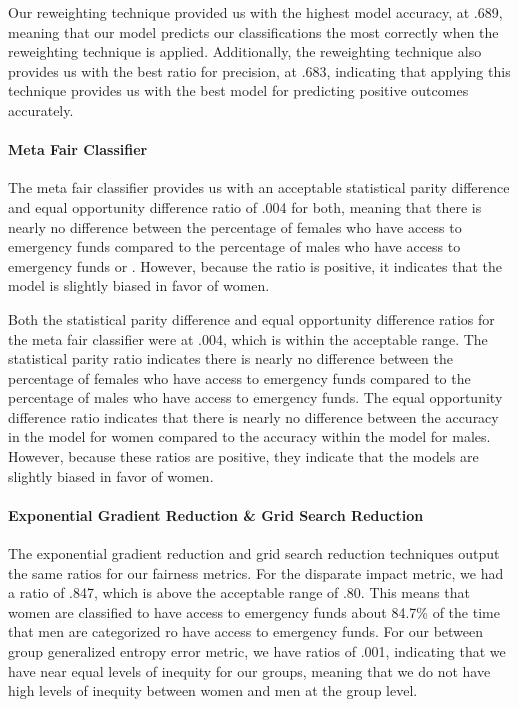 \documentclass[water,article,submit,moreauthors,pdftex]{mdpi}
\begin{document}
Our reweighting technique provided us with the highest model accuracy,
at .689, meaning that our model predicts our classifications the most
correctly when the reweighting technique is applied. Additionally, the
reweighting technique also provides us with the best ratio for
precision, at .683, indicating that applying this technique provides us
with the best model for predicting positive outcomes accurately.

\hypertarget{meta-fair-classifier}{%
\paragraph{Meta Fair Classifier}\label{meta-fair-classifier}}

The meta fair classifier provides us with an acceptable statistical
parity difference and equal opportunity difference ratio of .004 for
both, meaning that there is nearly no difference between the percentage
of females who have access to emergency funds compared to the percentage
of males who have access to emergency funds or . However, because the
ratio is positive, it indicates that the model is slightly biased in
favor of women.

Both the statistical parity difference and equal opportunity difference
ratios for the meta fair classifier were at .004, which is within the
acceptable range. The statistical parity ratio indicates there is nearly
no difference between the percentage of females who have access to
emergency funds compared to the percentage of males who have access to
emergency funds. The equal opportunity difference ratio indicates that
there is nearly no difference between the accuracy in the model for
women compared to the accuracy within the model for males. However,
because these ratios are positive, they indicate that the models are
slightly biased in favor of women.

\hypertarget{exponential-gradient-reduction-grid-search-reduction}{%
\paragraph{Exponential Gradient Reduction \& Grid Search
Reduction}\label{exponential-gradient-reduction-grid-search-reduction}}

The exponential gradient reduction and grid search reduction techniques
output the same ratios for our fairness metrics. For the disparate
impact metric, we had a ratio of .847, which is above the acceptable
range of .80. This means that women are classified to have access to
emergency funds about 84.7\% of the time that men are categorized ro
have access to emergency funds. For our between group generalized
entropy error metric, we have ratios of .001, indicating that we have
near equal levels of inequity for our groups, meaning that we do not
have high levels of inequity between women and men at the group level.
\end{document}
